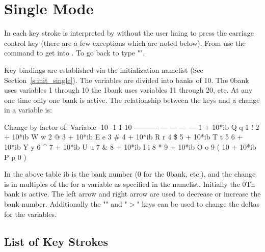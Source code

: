 \chapter{Single Mode}
\label{c:single}

In  each key stroke is interpreted by \tao without the user haing to press 
the carriage control key (there are a few exceptions which are noted below). From 
use the  command to get into . To go back to  type
"".

Key bindings are established via the  initialization namelist 
(See Section~\ref{s:init_single}). 
The variables are divided into banks of 10. The 0\Th bank uses variables 1
through 10 the 1\St bank uses variables 11 through 20, etc. 
At any one time only one bank is active. The relationship between
the keys and a change in a variable is:
\begin{example}
                 Change by factor of:          
     Variable    -10  -1    1   10
   ----------    ---  ---  ---  ---
    1 + 10*ib     Q    q    1    !   
    2 + 10*ib     W    w    2    @    
    3 + 10*ib     E    e    3    \#   
    4 + 10*ib     R    r    4    \$   
    5 + 10*ib     T    t    5    %
    6 + 10*ib     Y    y    6    ^   
    7 + 10*ib     U    u    7    \&
    8 + 10*ib     I    i    8    *   
    9 + 10*ib     O    o    9    (   
   10 + 10*ib     P    p    0    )   
\end{example}
In the above table ib is the bank number (0 for the 0\Th bank, etc.), 
and the change is in
multiples of the  for a variable as specified in the 
namelist. Initially the 0Th bank is active. The
left arrow and right arrow are used to decrease or increase the bank number. 
Additionally the "\vn{<}" and "$>$" keys can be used to change the deltas for the variables. 

\section{List of Key Strokes}
\label{s:keys}

